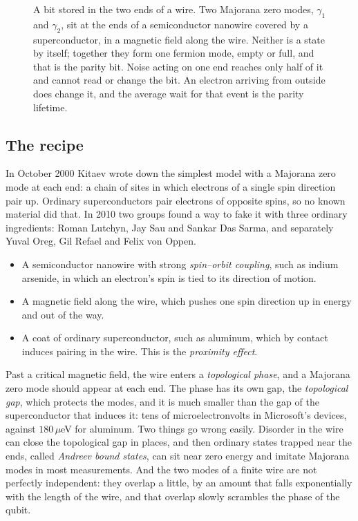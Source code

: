 \begin{figure}[htbp]
\caption{A bit stored in the two ends of a wire. Two Majorana zero modes, $\gamma_1$ and
$\gamma_2$, sit at the ends of a semiconductor nanowire covered by a superconductor, in a
magnetic field along the wire. Neither is a state by itself; together they form one fermion
mode, empty or full, and that is the parity bit. Noise acting on one end reaches only half of
it and cannot read or change the bit. An electron arriving from outside does change it, and
the average wait for that event is the parity lifetime.}\label{fig:majorana-wire}
\end{figure}

\subsection*{The recipe}

In October 2000 Kitaev wrote down the simplest model with a Majorana zero mode at each end: a
chain of sites in which electrons of a single spin direction pair up. Ordinary superconductors
pair electrons of opposite spins, so no known material did that. In 2010 two groups found a way
to fake it with three ordinary ingredients: Roman Lutchyn, Jay Sau and Sankar Das Sarma, and
separately Yuval Oreg, Gil Refael and Felix von Oppen.

\begin{itemize}
\item A semiconductor nanowire with strong \emph{spin--orbit coupling}, such as indium arsenide,
in which an electron's spin is tied to its direction of motion.
\item A magnetic field along the wire, which pushes one spin direction up in energy and out of
the way.
\item A coat of ordinary superconductor, such as aluminum, which by contact induces pairing in
the wire. This is the \emph{proximity effect}.
\end{itemize}

Past a critical magnetic field, the wire enters a \emph{topological phase}, and a Majorana zero
mode should appear at each end. The phase has its own gap, the \emph{topological gap}, which
protects the modes, and it is much smaller than the gap of the superconductor that induces it:
tens of microelectronvolts in Microsoft's devices, against $180\,\mu$eV for aluminum. Two
things go wrong easily. Disorder in the wire can close the topological gap in places, and then
ordinary states trapped near the ends, called \emph{Andreev bound states}, can sit near zero
energy and imitate Majorana modes in most measurements. And the two modes of a finite wire are
not perfectly independent: they overlap a little, by an amount that falls exponentially with
the length of the wire, and that overlap slowly scrambles the phase of the qubit.

